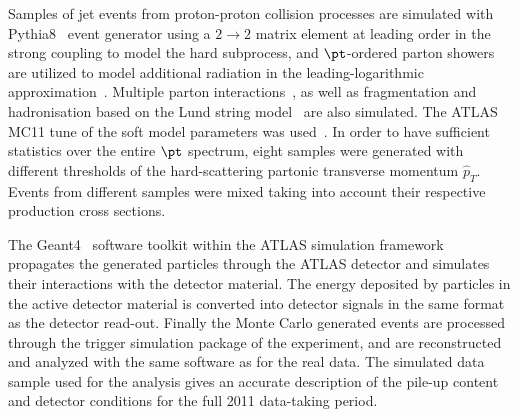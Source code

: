 Samples of jet events from proton-proton collision processes are simulated with {\sc Pythia8}~\cite{PYTHIA8} event generator using a $2\rightarrow 2$ matrix element at leading order in the strong coupling to model the hard subprocess, and $\pt$-ordered parton showers are utilized to model additional radiation in the leading-logarithmic approximation~\cite{Pythia_partonshowers}. Multiple parton interactions~\cite{Pythia_mpi}, as well as fragmentation and hadronisation based on the Lund string model~\cite{Lund_string_model} are also simulated.
The ATLAS MC11 tune of the soft model parameters was used~\cite{Pythia_MC11tune}.
In order to have sufficient statistics over the entire $\pt$ spectrum, eight samples were generated with different thresholds of the hard-scattering partonic transverse momentum $\hat{p}_T$. Events from different samples were mixed taking into account their respective production cross sections.

The {\sc Geant4}~\cite{GEANT4} software toolkit within the ATLAS simulation framework~\cite{ATLASSimulation} propagates the generated particles through the ATLAS detector and simulates their interactions with the detector material. The energy deposited by particles in the active detector material is converted into detector signals in the same format as the detector read-out. Finally the Monte Carlo generated events are processed through the trigger simulation package of the experiment, and are reconstructed and analyzed with the same software as for the real data.
The simulated data sample used for the analysis %
gives an accurate description of the pile-up content and detector conditions for the full 2011 data-taking period. 

